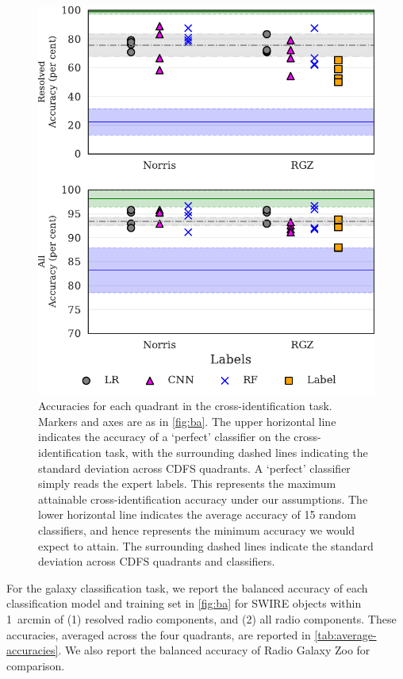\documentclass[fleqn,usenatbib,usedcolumn]{mnras}
\begin{document}
    \begin{figure}
      \centering
      \includegraphics[width=\columnwidth]{images/cdfs_cross_identification_grid.pdf}
      \caption{Accuracies for each quadrant in the cross-identification
        task. Markers and axes are as in \autoref{fig:ba}. The upper horizontal line
        indicates the accuracy of a `perfect' classifier on the cross-identification
        task, with the surrounding dashed lines indicating the standard deviation
        across CDFS quadrants. A `perfect' classifier simply reads the expert
        labels. This represents the maximum attainable cross-identification accuracy
        under our assumptions. The lower horizontal line indicates the average
        accuracy of 15 random classifiers, and hence represents the minimum accuracy
        we would expect to attain. The surrounding dashed lines indicate the
        standard deviation across CDFS quadrants and classifiers.
        \label{fig:cross-id-accuracy}}
    \end{figure}

    For the galaxy classification task, we report the balanced accuracy of
    each classification model and training set in \autoref{fig:ba} for SWIRE
    objects within 1~arcmin of (1) resolved radio components, and (2) all
    radio components. These accuracies, averaged across the four quadrants,
    are reported in \autoref{tab:average-accuracies}. We also report the
    balanced accuracy of Radio Galaxy Zoo for comparison.
\end{document}
